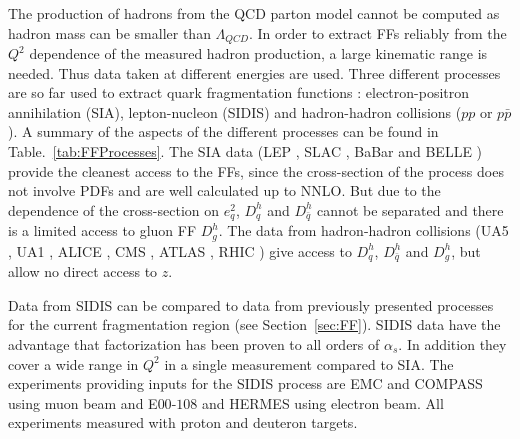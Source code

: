 The production of hadrons from the QCD parton model cannot be computed as hadron mass can be smaller than $\Lambda_{QCD}$. In order to extract FFs reliably from the $Q^2$ dependence of the measured hadron production, a large kinematic range is needed. Thus data taken at different energies are used. Three different processes are so far used to extract quark fragmentation functions : electron-positron annihilation (SIA), lepton-nucleon (SIDIS) and hadron-hadron collisions ($pp$ or $p\bar{p}$). A summary of the aspects of the different processes can be found in Table.~\ref{tab:FFProcesses}. The SIA data (LEP \cite{LEP1,LEP2,LEP3}, SLAC \cite{SLAC1}, BaBar \cite{BABAR} and BELLE \cite{BELLE}) provide the cleanest access to the FFs, since the cross-section of the process does not involve PDFs and are well calculated up to NNLO. But due to the dependence of the cross-section on $e^2_q$, $D^h_q$ and $D^h_{\bar{q}}$ cannot be separated and there is a limited access to gluon FF $D^h_g$. The data from hadron-hadron collisions (UA5 \cite{UA5}, UA1 \cite{UA1}, ALICE \cite{ALICE}, CMS \cite{CMS1,CMS2}, ATLAS \cite{ATLAS}, RHIC \cite{RHIC1,RHIC2,RHIC3}) give access to $D^h_q$, $D^h_{\bar{q}}$ and $D^h_g$, but allow no direct access to $z$.

Data from SIDIS can be compared to data from previously presented processes for the current fragmentation region (see Section~\ref{sec:FF}). SIDIS data have the advantage that factorization has been proven to all orders of $\alpha_s$. In addition they cover a wide range in $Q^2$ in a single measurement compared to SIA. The experiments providing inputs for the SIDIS process are EMC \cite{EMC} and COMPASS \cite{COMPASS2006Pi,COMPASS2006K} using muon beam and E$00$-$108$ \cite{E00108} and HERMES \cite{HERMESMult} using electron beam. All experiments measured with proton and deuteron targets.

